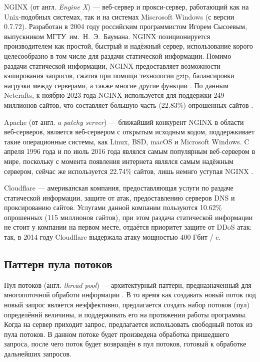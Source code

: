 NGINX (от англ. \textit{Engine X}) --- веб-сервер и прокси-сервер, работающий как на Unix-подобных системах, так и на системах Miscrosoft Windows (с версии 0.7.72). Разработан в 2004 году российским программистом Игорем Сысоевым, выпускником МГТУ~им.~Н.~Э.~Баумана. NGINX позиционируется производителем как простой, быстрый и надёжный сервер, использование корого целесообразно в том числе для раздачи статической информации. Помимо раздачи статической информации, NGINX предоставляет возможности кэширования запросов, сжатия при помощи технологии gzip, балансировки нагрузки между серверами, а также многие другие функции \cite{nginx}. По данным Netcrafts, к ноябрю 2023 года NGINX используется для поддержки 249 миллионов сайтов, что составляет большую часть (22.83\%) опрошенных сайтов \cite{nginx-popular}.

Apache (от англ. \textit{a patchy server}) --- ближайший конкурент NGINX в области веб-серверов, является веб-сервером с открытым исходным кодом, поддержкивает такие операционные системы, как Linux, BSD, macOS и Microsoft Windows. C апреля 1996 года и по июль 2016 года являлся самым популярным веб-сервером в мире, поскольку с момента появления интернета являлся самым надёжным сервером, сейчас же используется 22.74\% сайтов, лишь немнго уступая NGINX \cite{nginx-popular}.

Cloudflare --- американская компания, предоставляющая услуги по раздаче статической информации, защите от атак, предоставлению серверов DNS и проксированию сайтов. Услугами данной компании пользуются 10.62\% опрошенных (115 миллионов сайтов), при этом раздача статической информации не стоит у компании на первом месте, отдаётся приоритет защите от DDoS атак: так, в 2014 году Cloudflare выдержала атаку мощностью 400 Гбит / c.


\subsection{Паттерн пула потоков}

Пул потоков (англ. \textit{thread pool}) --- архитектурный паттерн, предназначенный для многопоточной обработи информации \cite{thread-pool}. В то время как создавать новый поток под новый запрос является неэффективно, предлагается создать набор потоков (пул) определённй величины, и поддерживать его на протяжении работы программы. Когда на сервер приходит запрос, предлагается использовать свободный поток из пула потоков. В данном потоке будет произведена обработка пришедшего запроса, после чего поток будет возвращён в пул потоков, готовый к обработке дальнейших запросов. 

